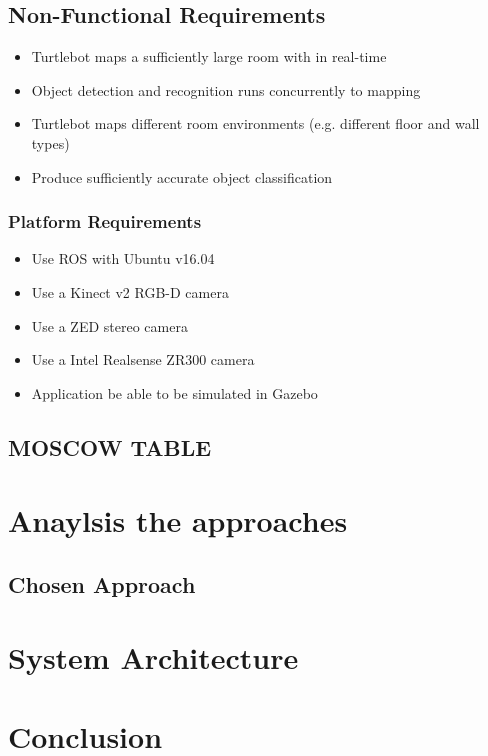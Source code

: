 \documentclass{mproj}
\begin{document}
\subsection{Non-Functional Requirements}
\begin{itemize}
\item Turtlebot maps a sufficiently large room with in real-time
\item Object detection and recognition runs concurrently to mapping
\item Turtlebot maps different room environments (e.g. different floor and wall types)
\item Produce sufficiently accurate object classification
\end{itemize}

\subsubsection{Platform Requirements}
\begin{itemize}
\item Use ROS with Ubuntu v16.04
\item Use a Kinect v2 RGB-D camera
\item Use a ZED stereo camera
\item Use a Intel Realsense ZR300 camera
\item Application be able to be simulated in Gazebo
\end{itemize}

\subsection{MOSCOW TABLE}

\section{Anaylsis the approaches}

\subsection{Chosen Approach}

\section{System Architecture}

\section{Conclusion}
\end{document}
